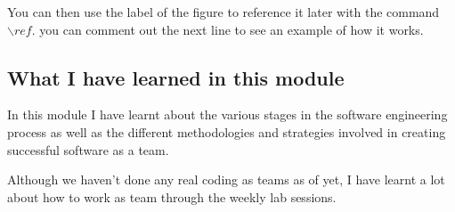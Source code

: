 You can then use the label of the figure to reference it later with the command ${\backslash}ref.$ you can comment out the next line to see an example of how it works.


\subsection{What I have learned in this module}
In this module I have learnt about the various stages in the software engineering process as well as the different methodologies and strategies involved in creating successful software as a team.

Although we haven't done any real coding as teams as of yet, I have learnt a lot about how to work as team through the weekly lab sessions.

